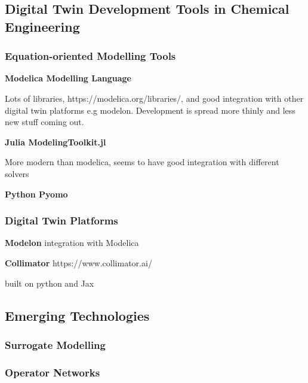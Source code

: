 \subsection{Digital Twin Development Tools in Chemical Engineering}


\subsubsection{Equation-oriented Modelling Tools}








\textbf{Modelica Modelling Language}

Lots of libraries, https://modelica.org/libraries/, and good integration with other digital twin platforms e.g modelon. Development is spread more thinly and less new stuff coming out.


\textbf{Julia ModelingToolkit.jl}

More modern than modelica, seems to have good integration with different solvers


\textbf{Python Pyomo}



\subsubsection{Digital Twin Platforms}

\textbf{Modelon}
integration with Modelica 

\textbf{Collimator}
https://www.collimator.ai/


built on python and Jax

\subsection{Emerging Technologies }





\subsubsection{Surrogate Modelling}

\subsubsection{Operator Networks}



